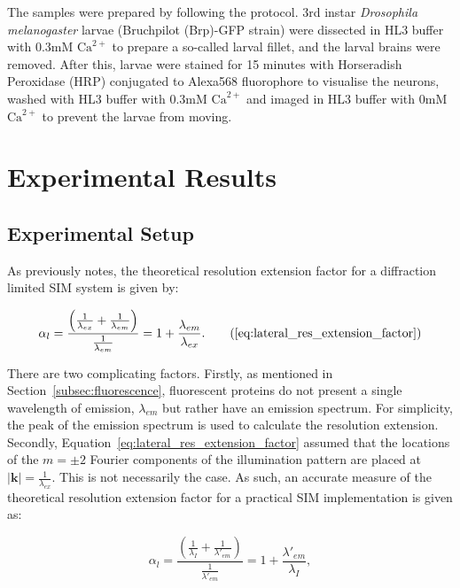 The samples were prepared by following the 
protocol\cite{brent2009drosophila}. 3rd instar \textit{Drosophila 
	melanogaster} larvae (Bruchpilot (Brp)-GFP strain) were dissected in HL3 
buffer with 0.3mM $\text{Ca}^{2+}$ to prepare a so-called larval fillet,
and the larval brains were removed. After this, larvae were stained for 15 
minutes with Horseradish Peroxidase (HRP) conjugated to Alexa568 
fluorophore to visualise the neurons, washed with HL3 buffer with 0.3mM 
$\text{Ca}^{2+}$ and imaged in HL3 buffer with 0mM $\text{Ca}^{2+}$ to 
prevent the larvae from moving.

\section{Experimental Results}
\label{sec:DeepSIM_results}

\subsection{Experimental Setup}
\label{subsec:DeepSIM_setup}

As previously notes, the theoretical resolution extension factor for 
a diffraction limited SIM system is given by:

\begin{equation}
\alpha_{l} = \frac{\left(\frac{1}{\lambda_{ex}} + \frac{1}{\lambda_{em}}\right)}{\frac{1}{\lambda_{em}}} = 1 + \frac{\lambda_{em}}{\lambda_{ex}}.\tag{\ref{eq:lateral_res_extension_factor}}
\end{equation}

There are two complicating factors. Firstly, as mentioned in 
Section~\ref{subsec:fluorescence}, fluorescent proteins do not present 
a single wavelength of emission, $\lambda_{em}$ but rather have an 
emission spectrum. For simplicity, the peak of the emission spectrum is
used to calculate the resolution extension. Secondly, 
Equation~\ref{eq:lateral_res_extension_factor} assumed that the locations
of the $m=\pm2$ Fourier components of the illumination pattern are placed
at $\left|\textbf{k}\right| = \frac{1}{\lambda_{ex}}$. This is not 
necessarily the case. As such, an accurate measure of the theoretical
resolution extension factor for a practical SIM implementation is given as:

\begin{equation}\label{eq:lateral_res_extension_factor_real}
\alpha_{l} = \frac{\left(\frac{1}{\lambda_{I}} + \frac{1}{\lambda'_{em}}\right)}{\frac{1}{\lambda'_{em}}} = 1 + \frac{\lambda'_{em}}{\lambda_{I}},
\end{equation}

